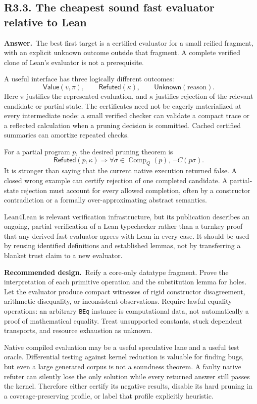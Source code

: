 \documentclass[11pt,a4paper]{article}
\newcommand{\code}[1]{\nolinkurl{#1}}
\newcommand{\qid}[3]{\subsection{#2. #3}\label{#1}}
\newcommand{\answer}{\noindent\textbf{Answer.}\ }
\newcommand{\proposal}{\noindent\textbf{Recommended design.}\ }
\newcommand{\Comp}{\operatorname{Comp}}
\theoremstyle{remark}
\begin{document}
\qid{q33}{R3.3}{The cheapest sound fast evaluator relative to Lean}
\answer The best first target is a certified evaluator for a small reified fragment, with an explicit unknown outcome outside that fragment. A complete verified clone of Lean's evaluator is not a prerequisite.

A useful interface has three logically different outcomes:
\[
 \mathsf{Value}(v,\pi),\qquad
 \mathsf{Refuted}(\kappa),\qquad
 \mathsf{Unknown}(\text{reason}).
\]
Here $\pi$ justifies the represented evaluation, and $\kappa$ justifies rejection of the relevant candidate or partial state. The certificates need not be eagerly materialized at every intermediate node: a small verified checker can validate a compact trace or a reflected calculation when a pruning decision is committed. Cached certified summaries can amortize repeated checks.

For a partial program $p$, the desired pruning theorem is
\begin{equation}\label{eq:prune}
 \mathsf{Refuted}(p,\kappa)
 \Longrightarrow
 \forall\sigma\in\Comp_Q(p),\ \neg C(p\sigma).
\end{equation}
It is stronger than saying that the current native execution returned false. A closed wrong example can certify rejection of one completed candidate. A partial-state rejection must account for every allowed completion, often by a constructor contradiction or a formally over-approximating abstract semantics.

Lean4Lean is relevant verification infrastructure, but its publication describes an ongoing, partial verification of a Lean typechecker rather than a turnkey proof that any derived fast evaluator agrees with Lean in every case. It should be used by reusing identified definitions and established lemmas, not by transferring a blanket trust claim to a new evaluator.~\cite{lean4lean}

\proposal Reify a core-only datatype fragment. Prove the interpretation of each primitive operation and the substitution lemma for holes. Let the evaluator produce compact witnesses of rigid constructor disagreement, arithmetic disequality, or inconsistent observations. Require lawful equality operations: an arbitrary \code{BEq} instance is computational data, not automatically a proof of mathematical equality. Treat unsupported constants, stuck dependent transports, and resource exhaustion as unknown.

Native compiled evaluation may be a useful speculative lane and a useful test oracle. Differential testing against kernel reduction is valuable for finding bugs, but even a large generated corpus is not a soundness theorem. A faulty native refuter can silently lose the only solution while every returned answer still passes the kernel. Therefore either certify its negative results, disable its hard pruning in a coverage-preserving profile, or label that profile explicitly heuristic.
\end{document}

